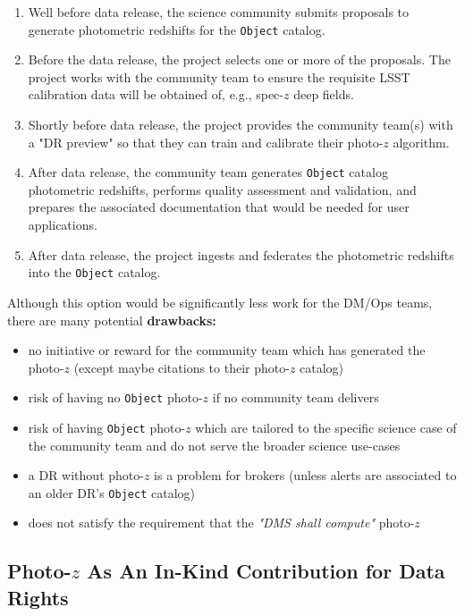 \documentclass[DM,lsstdraft,toc]{lsstdoc}
\begin{document}
\begin{enumerate}[noitemsep,topsep=-10pt]
\item Well before data release, the science community submits proposals to generate photometric redshifts for the {\tt Object} catalog.
\item Before the data release, the project selects one or more of the proposals. 
The project works with the community team to ensure the requisite LSST calibration data will be obtained of, e.g., spec-$z$ deep fields.
\item Shortly before data release, the project provides the community team(s) with a "DR preview" so that they can train and calibrate their photo-$z$ algorithm.
\item After data release, the community team generates {\tt Object} catalog photometric redshifts, performs quality assessment and validation, and prepares the associated documentation that would be needed for user applications.
\item After data release, the project ingests and federates the photometric redshifts into the {\tt Object} catalog.
\end{enumerate}

Although this option would be significantly less work for the DM/Ops teams, there are many potential {\bf drawbacks:}

\begin{itemize}[noitemsep,topsep=-10pt]
\item no initiative or reward for the community team which has generated the photo-$z$ (except maybe citations to their photo-$z$ catalog)
\item risk of having no {\tt Object} photo-$z$ if no community team delivers
\item risk of having {\tt Object} photo-$z$ which are tailored to the specific science case of the community team and do not serve the broader science use-cases
\item a DR without photo-$z$ is a problem for brokers (unless alerts are associated to an older DR's {\tt Object} catalog)
\item does not satisfy the requirement that the {\it "DMS shall compute"} photo-$z$
\end{itemize}

\subsection{Photo-$z$ As An In-Kind Contribution for Data Rights}\label{ssec:dmingest_inkind}
\end{document}
